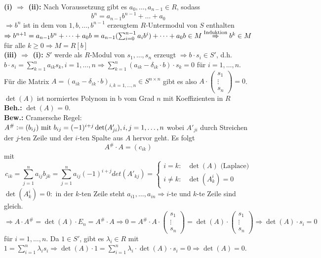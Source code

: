 \documentclass[a4paper, 10pt]{report}
\begin{document}
\begin{Bew} 
  \textbf{(i) $\Rightarrow$ (ii):}
  Nach Voraussetzung gibt es $a_0, \dots , a_{n-1} \in R$, sodass 
  \[
  b^n = a_{n-1} b^{n-1} + \dots + a_0
  \] 
  $\Rightarrow b^n$ ist in dem von $1, b, \dots , b^{n-1}$
  erzeugtem $R$-Untermodul von $S$ enthalten $\Rightarrow b^{n+1} = a_{n-1} b^n
  + \dots + a_0 b = a_{n-1} (\sum_{i=0}^{n-1} a_i b^i) + \dots + a_0 b \in M
  \overset{\text{\scriptsize Induktion}}{\Rightarrow} b^k \in M$ für alle $k \ge
  0 \Rightarrow M = R[b]$\\
  \textbf{(iii) $\Rightarrow$ (i):}
  $S'$ werde als $R$-Modul von $s_1, \dots , s_n$ erzeugt $\Rightarrow b \cdot
  s_i \in S'$, d.h. $b \cdot s_i = \sum_{k = 1}^n a_{i k} s_k, i=1,\dots,n
  \Rightarrow \sum_{k = 1}^n (a_{i k} -\delta_{i k} \cdot b) \cdot s_k = 0$ für
  $i=1, \dots, n$.\\
  Für die Matrix $A = (a_{i k} - \delta_{i k} \cdot b)_{i,k =1, \dots, n} \in S
  ^{n \times n}$ gibt es also $A \cdot \begin{pmatrix}s_1 \\ \vdots \\ s_n
  \end{pmatrix} = 0$.
  $\det(A)$ ist normiertes Polynom in b vom Grad $n$ mit Koeffizienten in $R$\\
  \textbf{Beh.:} $\det(A)$ = 0.\\
  \textbf{Bew.:} Cramersche Regel:\\
  $A^{\#} \mathrel{\mathop:}= (b_{i j}) \text{ mit } b_{i j} = (-1)^{i+j} \det(A'_{j i}),
  i,j= 1, \dots, n$ wobei $A'_{j i}$ durch Streichen der $j$-ten Zeile und
  der $i$-ten Spalte aus $A$ hervor geht. Es folgt 
  \[
  A^{\#} \cdot A = (c_{i k})
  \]
  mit
\[ c_{i k} = \sum_{j = 1}^n a_{i j} b_{j
  k} =
  \sum_{j = 1}^n a_{i j} (-1)^{i+j} det(A'_{k j}) = \begin{cases}
  i=k: & \det(A) \text{ (Laplace)}\\
  i \not= k: & \det(A_k^i) = 0
  \end{cases}
\]
  $\det(A_k^i) = 0:$ in der $k$-ten Zeile steht $a_{i 1}, \dots , a_{i n}
  \Rightarrow i$-te und $k$-te Zeile sind gleich.\\
  $\Rightarrow A \cdot A^{\#} = \det(A) \cdot E_n = A^{\#} \cdot A
  \Rightarrow 0 = A^{\#} \cdot A \cdot \begin{pmatrix}s_1 \\ \vdots \\ s_n 
  \end{pmatrix} = \det(A) \cdot \begin{pmatrix}s_1 \\ \vdots \\ s_n 
  \end{pmatrix} \Rightarrow \det(A) \cdot s_i = 0$ für $i = 1, \dots,
  n$.
  Da $1 \in S'$, gibt es $\lambda_i \in R$ mit $1 = \sum_{i=1}^n \lambda_i s_i
  \Rightarrow \det(A) \cdot 1 = \sum_{i=1}^n \lambda_i \cdot \det(A)
  \cdot s_i = 0 \Rightarrow \det(A) = 0$.
\end{Bew}
\end{document}
